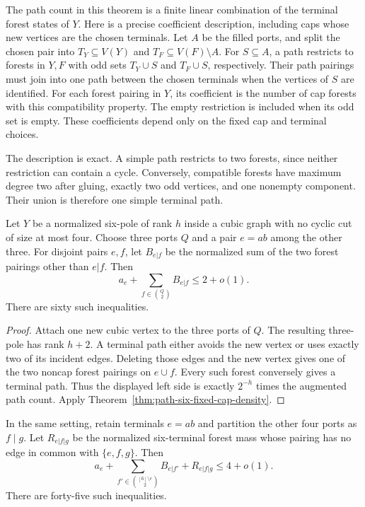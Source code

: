 The path count in this theorem is a finite linear combination of the terminal forest states of $Y$.
Here is a precise coefficient description, including caps whose new vertices are the chosen terminals.
Let $A$ be the filled ports, and split the chosen pair into $T_Y\subseteq V(Y)$ and $T_F\subseteq V(F)\setminus A$.
For $S\subseteq A$, a path restricts to forests in $Y,F$ with odd sets $T_Y\cup S$ and $T_F\cup S$, respectively.
Their path pairings must join into one path between the chosen terminals when the vertices of $S$ are identified.
For each forest pairing in $Y$, its coefficient is the number of cap forests with this compatibility property.
The empty restriction is included when its odd set is empty.
These coefficients depend only on the fixed cap and terminal choices.

The description is exact.
A simple path restricts to two forests, since neither restriction can contain a cycle.
Conversely, compatible forests have maximum degree two after gluing, exactly two odd vertices, and one nonempty component.
Their union is therefore one simple terminal path.

\begin{corollary}
\label{cor:path-six-star-cap}
Let $Y$ be a normalized six-pole of rank $h$ inside a cubic graph with no cyclic cut of size at most four.
Choose three ports $Q$ and a pair $e=ab$ among the other three.
For disjoint pairs $e,f$, let $B_{e|f}$ be the normalized sum of the two forest pairings other than $e|f$.
Then
\[
 a_e+\sum_{f\in\binom Q2}B_{e|f}\le2+o(1).
\]
There are sixty such inequalities.
\end{corollary}

\begin{proof}
Attach one new cubic vertex to the three ports of $Q$.
The resulting three-pole has rank $h+2$.
A terminal path either avoids the new vertex or uses exactly two of its incident edges.
Deleting those edges and the new vertex gives one of the two noncap forest pairings on $e\cup f$.
Every such forest conversely gives a terminal path.
Thus the displayed left side is exactly $2^{-h}$ times the augmented path count.
Apply Theorem~\ref{thm:path-six-fixed-cap-density}.
\end{proof}

\begin{corollary}
\label{cor:path-six-binary-tree-cap}
In the same setting, retain terminals $e=ab$ and partition the other four ports as $f\mid g$.
Let $R_{e|f|g}$ be the normalized six-terminal forest mass whose pairing has no edge in common with $\{e,f,g\}$.
Then
\[
 a_e+\sum_{f'\in\binom{[6]\setminus e}{2}}B_{e|f'}
     +R_{e|f|g}\le4+o(1).
\]
There are forty-five such inequalities.
\end{corollary}

